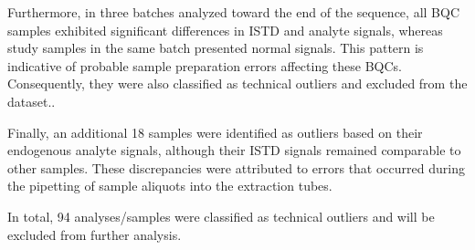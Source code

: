 \documentclass[
  letterpaper,
  DIV=11,
  numbers=noendperiod]{scrartcl}
\newenvironment{Shaded}{\begin{snugshade}}{\end{snugshade}}
\newcommand{\CommentTok}[1]{\textcolor[rgb]{0.37,0.37,0.37}{#1}}
\newcommand{\FunctionTok}[1]{\textcolor[rgb]{0.28,0.35,0.67}{#1}}
\newcommand{\NormalTok}[1]{\textcolor[rgb]{0.00,0.23,0.31}{#1}}
\newcommand{\SpecialCharTok}[1]{\textcolor[rgb]{0.37,0.37,0.37}{#1}}
\begin{document}
Furthermore, in three batches analyzed toward the end of the sequence,
all BQC samples exhibited significant differences in ISTD and analyte
signals, whereas study samples in the same batch presented normal
signals. This pattern is indicative of probable sample preparation
errors affecting these BQCs. Consequently, they were also classified as
technical outliers and excluded from the dataset..

Finally, an additional 18 samples were identified as outliers based on
their endogenous analyte signals, although their ISTD signals remained
comparable to other samples. These discrepancies were attributed to
errors that occurred during the pipetting of sample aliquots into the
extraction tubes.

\begin{Shaded}
\end{Shaded}

In total, 94 analyses/samples were classified as technical outliers and
will be excluded from further analysis.
\end{document}
